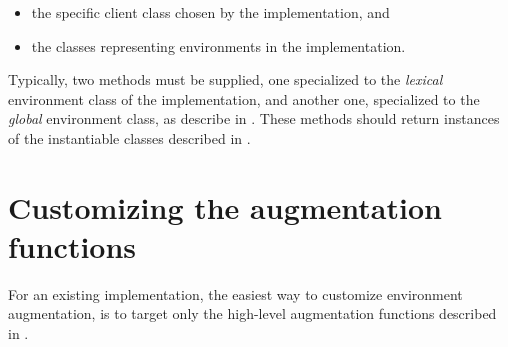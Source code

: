 \begin{itemize}
\item the specific client class chosen by the implementation, and
\item the classes representing environments in the implementation.
\end{itemize}

Typically, two methods must be supplied, one specialized to the
\emph{lexical} environment class of the implementation, and another
one, specialized to the \emph{global} environment class, as describe
in .  These methods
should return instances of the instantiable classes described in
.

\section{Customizing the augmentation functions}

For an existing implementation, the easiest way to customize
environment augmentation, is to target only the high-level
augmentation functions described in
.
